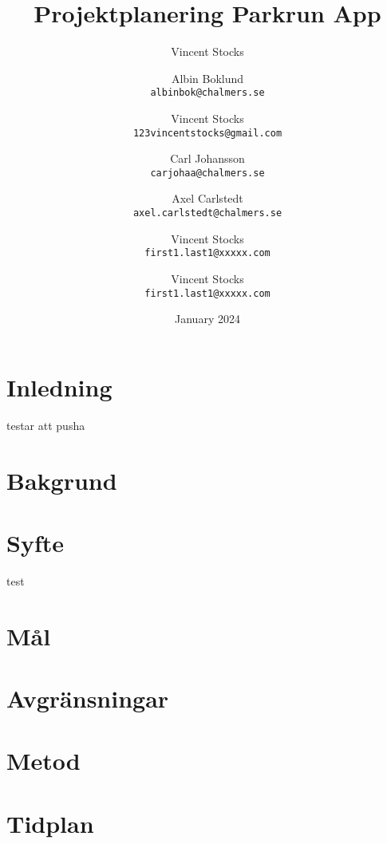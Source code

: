 \documentclass{article}
\title{Projektplanering Parkrun App}
\author{Vincent Stocks}
\author{
    Albin Boklund\\
    \texttt{albinbok@chalmers.se}
    \and
    Vincent Stocks\\
    \texttt{123vincentstocks@gmail.com}
    \and
    Carl Johansson\\
    \texttt{carjohaa@chalmers.se}
    \and
    Axel Carlstedt\\
    \texttt{axel.carlstedt@chalmers.se}
    \and
    Vincent Stocks\\
    \texttt{first1.last1@xxxxx.com}
    \and
    Vincent Stocks\\
    \texttt{first1.last1@xxxxx.com}
}
\date{January 2024}
\begin{document}
\maketitle

\newpage
\tableofcontents
\section{Inledning}
testar att pusha
\section{Bakgrund}
\section{Syfte}
test
\section{Mål}

\section{Avgränsningar}

\section{Metod}

\section{Tidplan}
\end{document}
